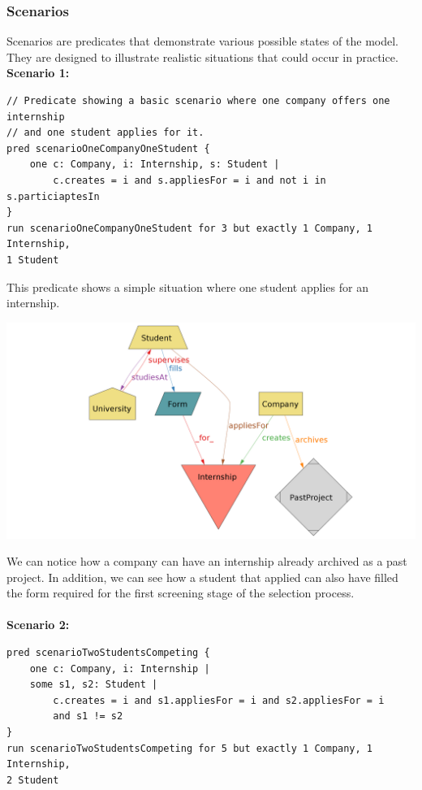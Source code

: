 \documentclass[11pt,twoside]{article}
\begin{document}
		\subsubsection{Scenarios}
Scenarios are predicates that demonstrate various possible states of the model. They are designed to illustrate realistic situations that could occur in practice.
\vspace{1\baselineskip} \\
\textbf{Scenario 1:}
{\small
\begin{verbatim}
// Predicate showing a basic scenario where one company offers one internship
// and one student applies for it.
pred scenarioOneCompanyOneStudent {
    one c: Company, i: Internship, s: Student |
        c.creates = i and s.appliesFor = i and not i in s.particiaptesIn
}
run scenarioOneCompanyOneStudent for 3 but exactly 1 Company, 1 Internship,
1 Student
\end{verbatim}}
This predicate shows a simple situation where one student applies for an internship.
\newpage
\begin{center}
\includegraphics[width=\textwidth]{Images/Scenario1}
\end{center}
We can notice how a company can have an internship already archived as a past project. In addition, we can see how a student that applied can also have filled the form required for the first screening stage of the selection process. \\
\vspace{1\baselineskip} \\
\textbf{Scenario 2:}
{\small
\begin{verbatim}
pred scenarioTwoStudentsCompeting {
    one c: Company, i: Internship | 
    some s1, s2: Student |
        c.creates = i and s1.appliesFor = i and s2.appliesFor = i
        and s1 != s2
}
run scenarioTwoStudentsCompeting for 5 but exactly 1 Company, 1 Internship,
2 Student
\end{verbatim}}
\end{document}
